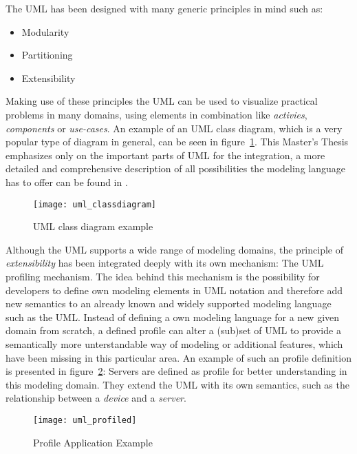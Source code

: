 The \ac{UML} has been designed with many generic principles in
mind\cite{OMGUMLSpecification} such as:
\begin{itemize}
  \item Modularity
  \item Partitioning
  \item Extensibility  
\end{itemize}
Making use of these principles the \ac{UML} can be used to visualize practical
problems in many domains, using elements in combination like \textit{activies},
\textit{components} or \textit{use-cases}. An example of an \ac{UML} class
diagram, which is a very popular type of diagram in general, can be seen in
figure~\ref{uml_classdiagram}. This Master's Thesis emphasizes only on the
important parts of \ac{UML} for the integration, a more detailed and
comprehensive description of all possibilities the modeling language has to offer can be found in
\cite{UMLNutshell}.
\begin{figure}%
\begin{center}
\texttt{[image: uml\_classdiagram]}\\
\end{center}
\caption{\ac{UML} class diagram example~\cite{Wik13_2}}
\label{uml_classdiagram}
\end{figure}

Although the \ac{UML} supports a wide range of modeling domains, the principle
of \textit{extensibility} has been integrated deeply with its own mechanism: The
\ac{UML} profiling mechanism. The idea behind this mechanism is the possibility
for developers to define own modeling elements in \ac{UML} notation and
therefore add new semantics to an already known and widely supported modeling
language such as the \ac{UML}. Instead of defining a own modeling language for a
new given domain from scratch, a defined profile can alter a (sub)set of \ac{UML}
to provide a semantically more unterstandable way of modeling or additional
features, which have been missing in this particular area. An example of such an
profile definition is presented in figure~\ref{uml_profileexample}: Servers are
defined as profile for better understanding in this modeling domain. They extend
the \ac{UML} with its own semantics, such as the relationship between a
\textit{device} and a \textit{server}. 
\begin{figure}%
\begin{center}
\texttt{[image: uml\_profiled]}\\
\end{center}
\caption{Profile Application Example~\cite{UMLprofiled}}
\label{uml_profileexample}
\end{figure}

